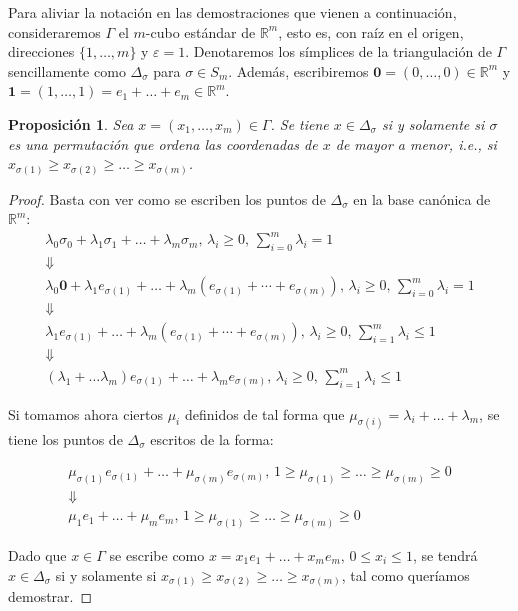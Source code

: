 \documentclass[12pt,a4paper,twoside]{article} %
\theoremstyle{plain}
\newtheorem{proposicion}{Proposición}[subsection]
\theoremstyle{definition}
\newcommand{\R}{\mathbb{R}}
\begin{document}
Para aliviar la notación en las demostraciones que vienen a continuación, consideraremos $\Gamma$ el $m$-cubo estándar de $\R^m$, esto es, con raíz en el origen, direcciones $\{1,\dots,m\}$ y $\varepsilon=1$. Denotaremos los símplices de la triangulación de $\Gamma$ sencillamente como $\Delta_\sigma$ para $\sigma \in S_m$. Además, escribiremos $\bm{0}=(0,\dots,0)\in \R^m$ y $\bm{1}=(1,\dots,1)=e_1+\dots+e_m\in\R^m$.

\begin{proposicion}
Sea $x=(x_1,\dots,x_m)\in\Gamma$. Se tiene $x\in \Delta_\sigma$ si y solamente si $\sigma$ es una permutación que ordena las coordenadas de $x$ de mayor a menor, i.e., si $x_{\sigma(1)}\geq x_{\sigma(2)} \geq \dots \geq x_{\sigma(m)}$.
\end{proposicion}

\begin{proof}
Basta con ver como se escriben los puntos de $\Delta_\sigma$ en la base canónica de $\R^m$:
\begin{equation*}
\begin{gathered}
\lambda_0 \sigma_0 + \lambda_1 \sigma_1 + \dots + \lambda_m \sigma_m, \, \lambda_i \geq 0 , \, \sum_{i=0}^m \lambda_i = 1 \\
\Downarrow \\
\lambda_0 \bm{0} + \lambda_1 e_{\sigma(1)} + \dots + \lambda_m (e_{\sigma(1)}+\cdots+e_{\sigma(m)}), \, \lambda_i \geq 0 , \, \sum_{i=0}^m \lambda_i = 1 \\
\Downarrow \\
\lambda_1 e_{\sigma(1)} + \dots + \lambda_m (e_{\sigma(1)}+\cdots+e_{\sigma(m)}), \, \lambda_i \geq 0 , \, \sum_{i=1}^m \lambda_i \leq 1  \\ 
\Downarrow \\
(\lambda_1 + \dots \lambda_m) e_{\sigma(1)} +  \dots + \lambda_m e_{\sigma(m)}, \, \lambda_i \geq 0 , \, \sum_{i=1}^m \lambda_i \leq 1 
\end{gathered}
\end{equation*}

Si tomamos ahora ciertos $\mu_i$ definidos de tal forma que $\mu_{\sigma(i)} = \lambda_i + \dots + \lambda_m$, se tiene los puntos de $\Delta_\sigma$ escritos de la forma:

\begin{equation*}
\begin{gathered}
\mu_{\sigma(1)} e_{\sigma(1)} + \dots + \mu_{\sigma(m)} e_{\sigma(m)}, \, 1 \geq \mu_{\sigma(1)} \geq \dots \geq \mu_{\sigma(m)} \geq 0 \\
\Downarrow \\
\mu_1 e_1 + \dots + \mu_m e_m, \, 1 \geq \mu_{\sigma(1)} \geq \dots \geq \mu_{\sigma(m)} \geq 0
\end{gathered}
\end{equation*}

Dado que $x\in \Gamma$ se escribe como $ x = x_1 e_1+\dots+x_m e_m , \, 0 \leq x_i \leq 1 $, se tendrá $x \in \Delta_\sigma$ si y solamente si $x_{\sigma(1)}\geq x_{\sigma(2)} \geq \dots \geq x_{\sigma(m)}$, tal como queríamos demostrar.
\end{proof}
\end{document}

